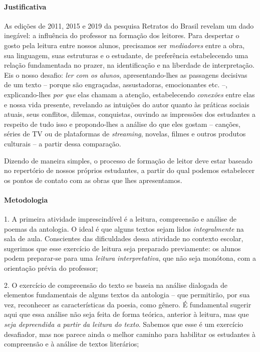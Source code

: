 \documentclass[11pt]{extarticle}
\begin{document}
\paragraph{Justificativa} As edições de 2011, 2015 e 2019 da pesquisa
Retratos do Brasil revelam um dado inegável: a influência do professor
na formação dos leitores. Para despertar o gosto pela leitura entre
nossos alunos, precisamos ser \emph{mediadores} entre a obra, sua
linguagem, suas estruturas e o estudante, de preferência estabelecendo
uma relação fundamentada no prazer, na identificação e na liberdade de
interpretação. Eis o nosso desafio: \emph{ler com os alunos},
apresentando-lhes as passagens decisivas de um texto -- porque são
engraçadas, assustadoras, emocionantes etc. --, explicando-lhes
\emph{por que} elas chamam a atenção, estabelecendo \emph{conexões}
entre elas e nossa vida presente, revelando as intuições do autor quanto
às práticas sociais atuais, seus conflitos, dilemas, conquistas, ouvindo
as impressões dos estudantes a respeito de tudo isso e propondo-lhes a
análise do que eles gostam -- canções, séries de TV ou de plataformas de
\emph{streaming}, novelas, filmes e outros produtos culturais -- a
partir dessa comparação.

Dizendo de maneira simples, o processo de
formação de leitor deve estar baseado no repertório de nossos próprios
estudantes, a partir do qual podemos estabelecer os pontos de contato
com as obras que lhes apresentamos.

\paragraph{Metodologia}

1. A primeira atividade imprescindível é a leitura, compreensão e
análise de poemas da antologia. O ideal é que alguns textos sejam lidos
\emph{integralmente} na sala de aula. Conscientes das dificuldades dessa
atividade no contexto escolar, sugerimos que esse exercício de leitura
seja preparado previamente: os alunos podem preparar-se para uma
\emph{leitura interpretativa}, que não seja monótona, com a orientação
prévia do professor;

\vspace{3mm}

2. O exercício de compreensão do texto se baseia na análise dialogada de
elementos fundamentais de alguns textos da antologia -- que permitirão,
por sua vez, reconhecer as características da poesia, como gênero. É
fundamental sugerir aqui que essa análise não seja feita de forma
teórica, anterior à leitura, mas que \emph{seja depreendida a partir da
leitura do texto}. Sabemos que esse é um exercício desafiador, mas nos
parece ainda o melhor caminho para habilitar os estudantes à compreensão
e à análise de textos literários;
\end{document}
